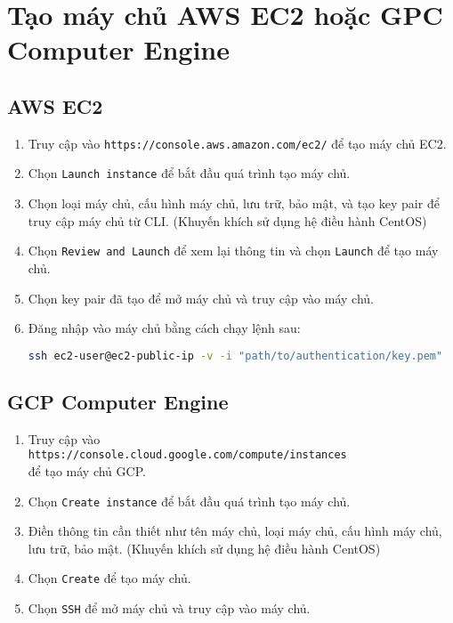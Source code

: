 \section{Tạo máy chủ AWS EC2 hoặc GPC Computer Engine}
\subsection{AWS EC2}
\begin{enumerate}
\item Truy cập vào \texttt{https://console.aws.amazon.com/ec2/} để tạo máy chủ EC2.
\item Chọn \texttt{Launch instance} để bắt đầu quá trình tạo máy chủ.
\item Chọn loại máy chủ, cấu hình máy chủ, lưu trữ, bảo mật, và tạo key pair để truy cập máy chủ từ CLI. (Khuyến khích sử dụng hệ điều hành CentOS)
\item Chọn \texttt{Review and Launch} để xem lại thông tin và chọn \texttt{Launch} để tạo máy chủ.
\item Chọn key pair đã tạo để mở máy chủ và truy cập vào máy chủ.
\item {Đăng nhập vào máy chủ bằng cách chạy lệnh sau: \\
\begin{lstlisting}[language=bash]
ssh ec2-user@ec2-public-ip -v -i "path/to/authentication/key.pem"
\end{lstlisting}}
\end{enumerate}
\subsection{GCP Computer Engine}
\begin{enumerate}
\item Truy cập vào \\
\texttt{https://console.cloud.google.com/compute/instances} \\ để tạo máy chủ GCP.
\item Chọn \texttt{Create instance} để bắt đầu quá trình tạo máy chủ.
\item Điền thông tin cần thiết như tên máy chủ, loại máy chủ, cấu hình máy chủ, lưu trữ, bảo mật. (Khuyến khích sử dụng hệ điều hành CentOS)
\item Chọn \texttt{Create} để tạo máy chủ.
\item Chọn \texttt{SSH} để mở máy chủ và truy cập vào máy chủ.
\end{enumerate}

